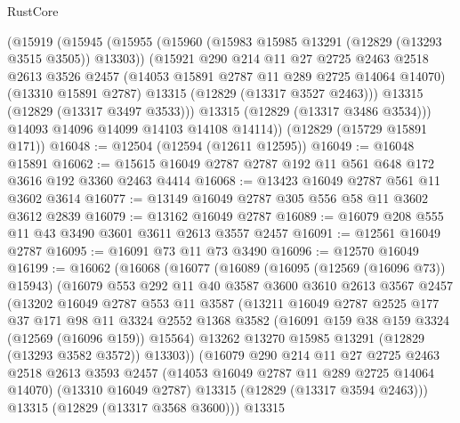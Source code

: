 \begin{lexlean}{RustCore}
\begin{coremodule}
      (@15919
        (@15945
          (@15955
            (@15960 (@15983 @15985 @13291 (@12829 (@13293 @3515 @3505)) @13303))
            (@15921
              @290
              @214
              @11
              @27
              @2725
              @2463
              @2518
              @2613
              @3526
              @2457
              (@14053 @15891 @2787 @11 @289 @2725 @14064 @14070)
              (@13310 @15891 @2787)
              @13315
              (@12829 (@13317 @3527 @2463)))
            @13315
            (@12829 (@13317 @3497 @3533)))
          @13315
          (@12829 (@13317 @3486 @3534)))
        @14093
        @14096
        @14099
        @14103
        @14108
        @14114))
    (@12829 (@15729 @15891 @171))
@16048 := @12504 (@12594 (@12611 @12595))
@16049 := @16048 @15891
@16062 := @15615 @16049 @2787 @2787 @192 @11 @561 @648 @172 @3616 @192 @3360 @2463 @4414
@16068 := @13423 @16049 @2787 @561 @11 @3602 @3614
@16077 := @13149 @16049 @2787 @305 @556 @58 @11 @3602 @3612 @2839
@16079 := @13162 @16049 @2787
@16089 := @16079 @208 @555 @11 @43 @3490 @3601 @3611 @2613 @3557 @2457
@16091 := @12561 @16049 @2787
@16095 := @16091 @73 @11 @73 @3490
@16096 := @12570 @16049
@16199 := @16062
    (@16068
      (@16077
        (@16089
          (@16095 (@12569 (@16096 @73)) @15943)
          (@16079
            @553
            @292
            @11
            @40
            @3587
            @3600
            @3610
            @2613
            @3567
            @2457
            (@13202
              @16049
              @2787
              @553
              @11
              @3587
              (@13211
                @16049
                @2787
                @2525
                @177
                @37
                @171
                @98
                @11
                @3324
                @2552
                @1368
                @3582
                (@16091 @159 @38 @159 @3324 (@12569 (@16096 @159)) @15564)
                @13262
                @13270
                @15985
                @13291
                (@12829 (@13293 @3582 @3572))
                @13303))
            (@16079
              @290
              @214
              @11
              @27
              @2725
              @2463
              @2518
              @2613
              @3593
              @2457
              (@14053 @16049 @2787 @11 @289 @2725 @14064 @14070)
              (@13310 @16049 @2787)
              @13315
              (@12829 (@13317 @3594 @2463)))
            @13315
            (@12829 (@13317 @3568 @3600)))
          @13315

\end{coremodule}
\end{lexlean}
